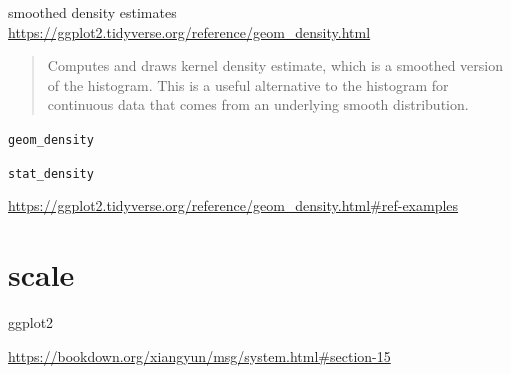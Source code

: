 \documentclass[
]{book}
\theoremstyle{definition}
\theoremstyle{definition}
\theoremstyle{definition}
\theoremstyle{definition}
\theoremstyle{remark}
\begin{document}
smoothed density estimates \url{https://ggplot2.tidyverse.org/reference/geom_density.html}

\begin{quote}
Computes and draws kernel density estimate, which is a smoothed version of the histogram. This is a useful alternative to the histogram for continuous data that comes from an underlying smooth distribution.
\end{quote}

\texttt{geom\_density}

\texttt{stat\_density}

\url{https://ggplot2.tidyverse.org/reference/geom_density.html\#ref-examples}

\hypertarget{scale}{%
\section{scale}\label{scale}}

ggplot2

\url{https://bookdown.org/xiangyun/msg/system.html\#section-15}
\end{document}
